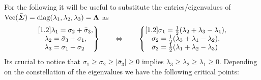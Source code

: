 For the following it will be useful to substitute the entries/eigenvalues of $\operatorname{Vee}(\bar{\boldsymbol{\varSigma}}) = \operatorname{diag}(\lambda_1, \lambda_2, \lambda_3) = \boldsymbol{\Lambda}$ as
\begin{align}
 \left.\begin{matrix}[1.2]
 \lambda_1 = \sigma_2 + \bar{\sigma}_3, \\
 \lambda_2 = \bar{\sigma}_3 + \sigma_1, \\
 \lambda_3 = \sigma_1 + \sigma_2\hphantom{,}  
 \end{matrix}\right\}
\qquad\Leftrightarrow \qquad
 \left\{\begin{matrix}[1.2]
 \sigma_1 = \tfrac{1}{2} (\lambda_2 + \lambda_3 - \lambda_1), \\
 \sigma_2 = \tfrac{1}{2} (\lambda_3 + \lambda_1 - \lambda_2), \\
 \bar{\sigma}_3 = \tfrac{1}{2} (\lambda_1 + \lambda_2 - \lambda_3)\hphantom{,}  
 \end{matrix}\right.
\end{align} 
Its crucial to notice that $\sigma_1 \geq \sigma_2 \geq |\bar{\sigma}_3| \geq 0$ implies $\lambda_3 \geq \lambda_2 \geq \lambda_1 \geq 0$.
Depending on the constellation of the eigenvalues we have the following critical points:
